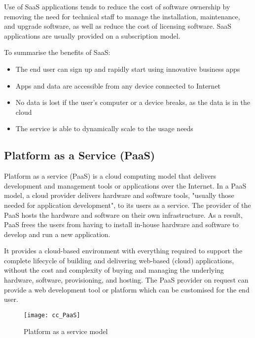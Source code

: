 Use of SaaS applications tends to reduce the cost of software ownership by removing the need for technical staff to manage the installation, maintenance, and upgrade software, as well as reduce the cost of licensing software. SaaS applications are usually provided on a subscription model.

To summarise the benefits of SaaS:
\begin{itemize}
	\item The end user can sign up and rapidly start using innovative business apps
	\item Apps and data are accessible from any device connected to Internet
	\item No data is lost if the user's computer or a device breaks, as the data is in the cloud
	\item The service is able to dynamically scale to the usage needs
\end{itemize}

\subsection{Platform as a Service (PaaS)}\label{ssec:PaaS}
Platform as a service (PaaS) is a cloud computing model that delivers development and management tools or applications over the Internet. In a PaaS model, a cloud provider delivers hardware and software tools, "usually those needed for application development", to its users as a service. The provider of the PaaS hosts the hardware and software on their own infrastructure. As a result, PaaS frees the users from having to install in-house hardware and software to develop and run a new application.

It provides a cloud-based environment with everything required to support the complete lifecycle of building and delivering web-based (cloud) applications, without the cost and complexity of buying and managing the underlying hardware, software, provisioning, and hosting. The PaaS provider on request can provide a web development tool or platform which can be customised for the end user.


\begin{figure}[H]
	\begin{center}
		\texttt{[image: cc\_PaaS]}
		\caption{Platform as a service model\cite{IBMcloud:PaaS}}
		\label{fig:cc_PaaS}
	\end{center}
	\vspace{-10pt}
\end{figure}

